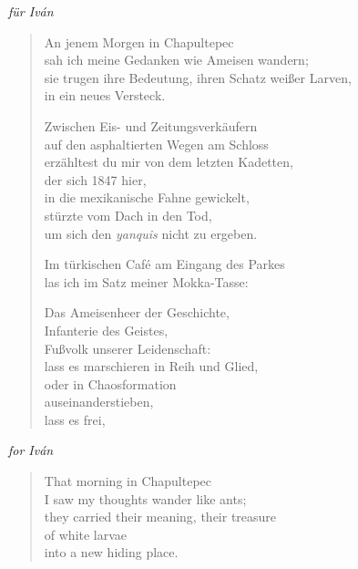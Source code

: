 
{\addtolength{\vleftmargin}{-1em}

\cleartoverso


\hspace{2em}\emph{für Iván}

\begin{verse}

An jenem Morgen in Chapultepec\\
sah ich meine Gedanken wie Ameisen wandern;\\
sie trugen ihre Bedeutung, ihren Schatz weißer Larven,\\
in ein neues Versteck.

Zwischen Eis- und Zeitungsverkäufern\\
auf den asphaltierten Wegen am Schloss\\
erzähltest du mir von dem letzten Kadetten,\\
der sich 1847 hier,\\
in die mexikanische Fahne gewickelt,\\
stürzte vom Dach in den Tod,\\
um sich den \emph{yanquis} nicht zu ergeben.

Im türkischen Café am Eingang des Parkes\\
las ich im Satz meiner Mokka-Tasse:

Das Ameisenheer der Geschichte,\\
Infanterie des Geistes,\\
Fußvolk unserer Leidenschaft:\\
lass es marschieren in Reih und Glied,\\
oder in Chaosformation\\
auseinanderstieben,\\
lass es frei,
\end{verse}

\clearpage


\hspace{2em}\emph{for Iván}

\begin{verse}

That morning in Chapultepec\\
I saw my thoughts wander like ants;\\
they carried their meaning, their treasure\\
of white larvae\\
into a new hiding place.


\end{verse}}
